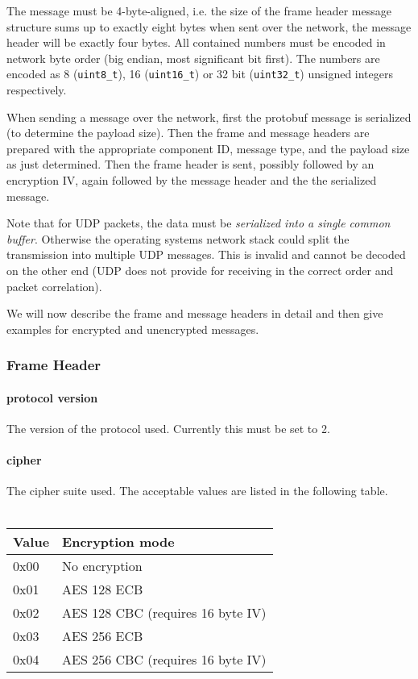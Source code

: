 \documentclass[a4paper]{article}
\begin{document}
\smallskip

The message must be 4-byte-aligned, i.e. the size of the frame header
message structure sums up to exactly eight bytes when sent over the
network, the message header will be exactly four bytes. All contained
numbers must be encoded in network byte order (big endian, most
significant bit first). The numbers are encoded as 8
(\texttt{uint8\_t}), 16 (\texttt{uint16\_t}) or 32 bit
(\texttt{uint32\_t}) unsigned integers respectively.

When sending a message over the network, first the protobuf message is
serialized (to determine the payload size). Then the frame and message
headers are prepared with the appropriate component ID, message type,
and the payload size as just determined. Then the frame header is
sent, possibly followed by an encryption IV, again followed by the
message header and the the serialized message.

Note that for UDP packets, the data must be \emph{serialized into a
  single common buffer}. Otherwise the operating systems network stack
could split the transmission into multiple UDP messages. This is
invalid and cannot be decoded on the other end (UDP does not provide
for receiving in the correct order and packet correlation).

We will now describe the frame and message headers in detail and then
give examples for encrypted and unencrypted messages.

\subsubsection{Frame Header}
\paragraph{protocol version}
  The version of the protocol used. Currently this must be set to 2.
\paragraph{cipher}
  The cipher suite used. The acceptable values are listed in the
  following table.\\
  \smallskip\\
  \hspace*{4em}\begin{tabular}{l|l}
    \textbf{Value} & \textbf{Encryption mode}\\\hline
    0x00 & No encryption\\
    0x01 & AES 128 ECB\\
    0x02 & AES 128 CBC (requires 16 byte IV)\\
    0x03 & AES 256 ECB\\
    0x04 & AES 256 CBC (requires 16 byte IV)\\
  \end{tabular}
\end{document}

